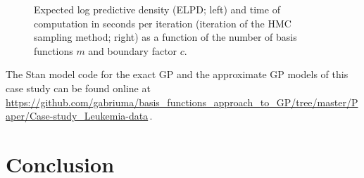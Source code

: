 \documentclass[onecolumn,a4paper,11pt]{article}
\begin{document}
\begin{figure}
\caption{Expected log predictive density (ELPD; left) and time of computation in seconds per iteration (iteration of the HMC sampling method; right) as a function of the number of basis functions $m$ and boundary factor $c$.}
  \label{ch5_fig22_elpd_leukemia}
\end{figure}

The Stan model code for the exact GP and the approximate GP models of this case study can be found online at {\small \url{https://github.com/gabriuma/basis_functions_approach_to_GP/tree/master/Paper/Case-study_Leukemia-data}}\,.
%

\section{Conclusion}\label{ch5_sec_conclusion}
\end{document}
